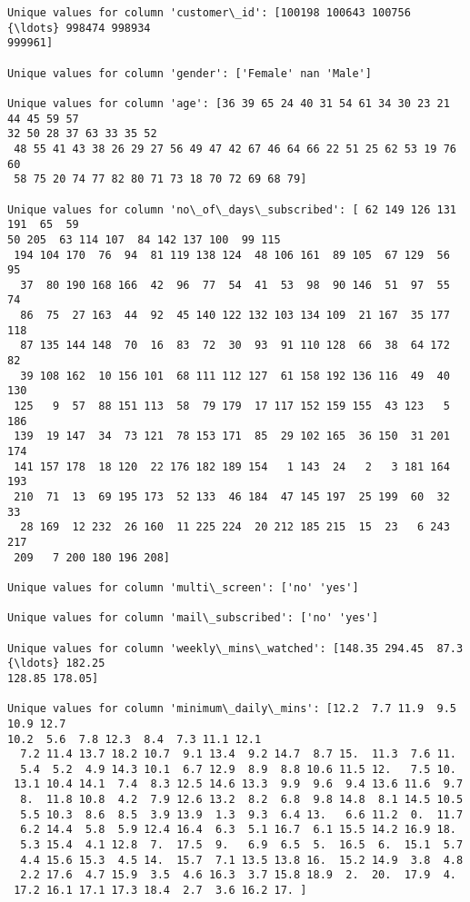 \documentclass[11pt]{article}
\begin{document}
    \begin{Verbatim}[commandchars=\\\{\}]
Unique values for column 'customer\_id': [100198 100643 100756 {\ldots} 998474 998934
999961]

Unique values for column 'gender': ['Female' nan 'Male']

Unique values for column 'age': [36 39 65 24 40 31 54 61 34 30 23 21 44 45 59 57
32 50 28 37 63 33 35 52
 48 55 41 43 38 26 29 27 56 49 47 42 67 46 64 66 22 51 25 62 53 19 76 60
 58 75 20 74 77 82 80 71 73 18 70 72 69 68 79]

Unique values for column 'no\_of\_days\_subscribed': [ 62 149 126 131 191  65  59
50 205  63 114 107  84 142 137 100  99 115
 194 104 170  76  94  81 119 138 124  48 106 161  89 105  67 129  56  95
  37  80 190 168 166  42  96  77  54  41  53  98  90 146  51  97  55  74
  86  75  27 163  44  92  45 140 122 132 103 134 109  21 167  35 177 118
  87 135 144 148  70  16  83  72  30  93  91 110 128  66  38  64 172  82
  39 108 162  10 156 101  68 111 112 127  61 158 192 136 116  49  40 130
 125   9  57  88 151 113  58  79 179  17 117 152 159 155  43 123   5 186
 139  19 147  34  73 121  78 153 171  85  29 102 165  36 150  31 201 174
 141 157 178  18 120  22 176 182 189 154   1 143  24   2   3 181 164 193
 210  71  13  69 195 173  52 133  46 184  47 145 197  25 199  60  32  33
  28 169  12 232  26 160  11 225 224  20 212 185 215  15  23   6 243 217
 209   7 200 180 196 208]

Unique values for column 'multi\_screen': ['no' 'yes']

Unique values for column 'mail\_subscribed': ['no' 'yes']

Unique values for column 'weekly\_mins\_watched': [148.35 294.45  87.3  {\ldots} 182.25
128.85 178.05]

Unique values for column 'minimum\_daily\_mins': [12.2  7.7 11.9  9.5 10.9 12.7
10.2  5.6  7.8 12.3  8.4  7.3 11.1 12.1
  7.2 11.4 13.7 18.2 10.7  9.1 13.4  9.2 14.7  8.7 15.  11.3  7.6 11.
  5.4  5.2  4.9 14.3 10.1  6.7 12.9  8.9  8.8 10.6 11.5 12.   7.5 10.
 13.1 10.4 14.1  7.4  8.3 12.5 14.6 13.3  9.9  9.6  9.4 13.6 11.6  9.7
  8.  11.8 10.8  4.2  7.9 12.6 13.2  8.2  6.8  9.8 14.8  8.1 14.5 10.5
  5.5 10.3  8.6  8.5  3.9 13.9  1.3  9.3  6.4 13.   6.6 11.2  0.  11.7
  6.2 14.4  5.8  5.9 12.4 16.4  6.3  5.1 16.7  6.1 15.5 14.2 16.9 18.
  5.3 15.4  4.1 12.8  7.  17.5  9.   6.9  6.5  5.  16.5  6.  15.1  5.7
  4.4 15.6 15.3  4.5 14.  15.7  7.1 13.5 13.8 16.  15.2 14.9  3.8  4.8
  2.2 17.6  4.7 15.9  3.5  4.6 16.3  3.7 15.8 18.9  2.  20.  17.9  4.
 17.2 16.1 17.1 17.3 18.4  2.7  3.6 16.2 17. ]


\end{Verbatim}
\end{document}
